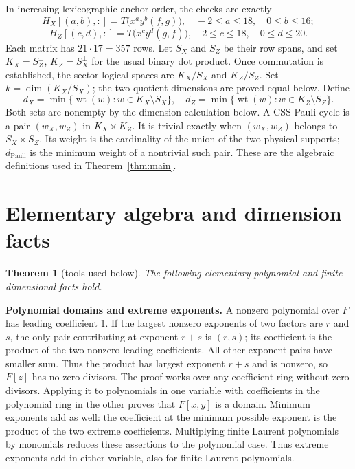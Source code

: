 \documentclass{article}
\newtheorem{theorem}{Theorem}
\DeclareMathOperator{\wt}{wt}
\begin{document}
In increasing lexicographic anchor order, the checks are exactly
\begin{equation}
  H_X[(a,b),{:}]=T\bigl(x^ay^b(f,g)\bigr),
  \quad -2\le a\le 18, \quad 0\le b\le 16;
\end{equation}
\begin{equation}
  H_Z[(c,d),{:}]=T\bigl(x^cy^d(\overline{g},\overline{f})\bigr),
  \quad 2\le c\le 18, \quad 0\le d\le 20.
\end{equation}
Each matrix has \(21\cdot 17=357\) rows.
Let \(S_X\) and \(S_Z\) be their row spans, and set
\(K_X=S_Z^{\perp}\), \(K_Z=S_X^{\perp}\) for the usual binary dot product.
Once commutation is established, the sector logical spaces are
\(K_X/S_X\) and \(K_Z/S_Z\). Set \(k=\dim(K_X/S_X)\); the two quotient
dimensions are proved equal below. Define
\begin{equation}
  d_X=\min\{\wt(w):w\in K_X\setminus S_X\}, \quad
  d_Z=\min\{\wt(w):w\in K_Z\setminus S_Z\}.
\end{equation}
Both sets are nonempty by the dimension calculation below.
A CSS Pauli cycle is a pair \((w_X,w_Z)\) in \(K_X\times K_Z\).
It is trivial exactly when \((w_X,w_Z)\) belongs to \(S_X\times S_Z\).
Its weight is the cardinality of the union of the two physical supports;
\(d_{\text{Pauli}}\) is the minimum weight of a nontrivial such pair. These are
the algebraic definitions used in Theorem~\ref{thm:main}.

\section{Elementary algebra and dimension facts}\label{sec:tools}

\begin{theorem}[tools used below]\label{thm:tools}
  The following elementary polynomial and finite-dimensional facts hold.
\end{theorem}

\textbf{Polynomial domains and extreme exponents.} A nonzero polynomial over
\(F\) has leading coefficient 1. If the largest nonzero exponents of two
factors are \(r\) and \(s\), the only pair contributing at exponent \(r+s\) is
\((r,s)\); its coefficient is the product of the two nonzero leading
coefficients. All other exponent pairs have smaller sum. Thus the product
has largest exponent \(r+s\) and is nonzero, so \(F[z]\) has no zero divisors.
The proof works over any coefficient ring without zero divisors. Applying it to
polynomials in one variable with coefficients in the polynomial ring in
the other proves that \(F[x,y]\) is a domain. Minimum exponents add as well:
the coefficient at the minimum possible exponent is the product of the
two extreme coefficients. Multiplying finite Laurent polynomials by
monomials reduces these assertions to the polynomial case. Thus extreme
exponents add in either variable, also for finite Laurent polynomials.
\end{document}
